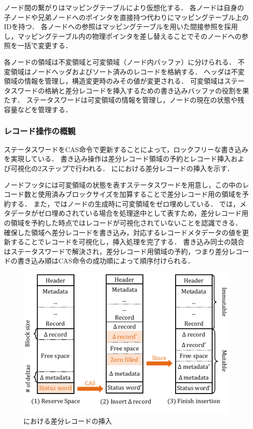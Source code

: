 ノード間の繋がりはマッピングテーブルにより仮想化する．
各ノードは自身の子ノードや兄弟ノードへのポインタを直接持つ代わりにマッピングテーブル上のIDを持つ．
各ノードへの参照はマッピングテーブルを用いた間接参照を採用し，マッピングテーブル内の物理ポインタを差し替えることでそのノードへの参照を一括で変更する．

各ノードの領域は不変領域と可変領域（ノード内バッファ）に分けられる．
不変領域はノードヘッダおよびソート済みのレコードを格納する．
ヘッダは不変領域の情報を管理し，構造変更時のみその値が変更される．
可変領域はステータスワードの格納と差分レコードを挿入するための書き込みバッファの役割を果たす．
ステータスワードは可変領域の情報を管理し，ノードの現在の状態や残容量などを管理する．

\subsubsection{レコード操作の概観}
ステータスワードをCAS命令で更新することによって，ロックフリーな書き込みを実現している．
書き込み操作は差分レコード領域の予約とレコード挿入および可視化の2ステップで行われる．
\Fig{\ref{fig:bc_tree_insertion}}に\Bctree{}における差分レコードの挿入を示す．

ノードフッタには可変領域の状態を表すステータスワードを用意し，この中のレコード数と使用済みブロックサイズを加算することで差分レコード用の領域を予約する．
また，\Bctree{}ではノードの生成時に可変領域をゼロ埋めしている．
\Bctree{}では，メタデータがゼロ埋めされている場合を処理途中として表すため，差分レコード用の領域を予約した時点ではレコードが可視化されていないことを認識できる．
確保した領域へ差分レコードを書き込み，対応するレコードメタデータの値を更新することでレコードを可視化し，挿入処理を完了する．
書き込み同士の競合はステータスワードで解決され，差分レコード用領域の予約，つまり差分レコードの書き込み順はCAS命令の成功順によって順序付けられる．

\begin{figure}[t]
    \centering
    \includegraphics{./figures/Bc-insertion.pdf}
    \caption{\Bctree{}における差分レコードの挿入}
    \label{fig:bc_tree_insertion}
\end{figure}

